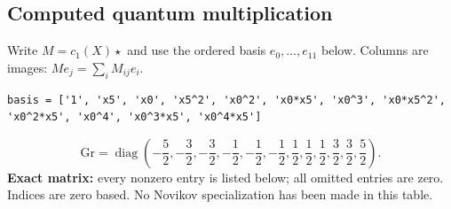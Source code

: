 \documentclass[10pt,a4paper]{article}
\begin{document}
\subsection*{Computed quantum multiplication}
Write $M=c_1(X)\star$ and use the ordered basis $e_0,\ldots,e_{11}$ below. Columns are images: $M e_j=\sum_i M_{ij}e_i$.
\begin{lstlisting}
basis = ['1', 'x5', 'x0', 'x5^2', 'x0^2', 'x0*x5', 'x0^3', 'x0*x5^2', 'x0^2*x5', 'x0^4', 'x0^3*x5', 'x0^4*x5']
\end{lstlisting}
\[\mathrm{Gr}=\operatorname{diag}\!\left(- \frac{5}{2},- \frac{3}{2},- \frac{3}{2},- \frac{1}{2},- \frac{1}{2},- \frac{1}{2},\frac{1}{2},\frac{1}{2},\frac{1}{2},\frac{3}{2},\frac{3}{2},\frac{5}{2}\right).\]
\textbf{Exact matrix:} every nonzero entry is listed below; all omitted entries are zero. Indices are zero based. No Novikov specialization has been made in this table.
\end{document}
